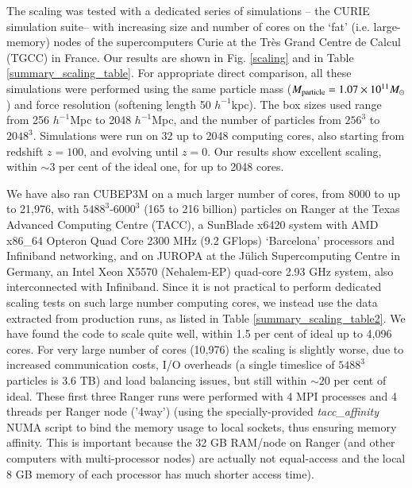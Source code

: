 

 
The scaling was tested with a dedicated series 
of simulations -- the CURIE simulation suite-- with increasing size and number of cores on the `fat' 
(i.e. large-memory) nodes of the supercomputers Curie at the Tr\`{e}s Grand Centre de Calcul (TGCC) in France. 
Our results are shown in Fig. \ref{scaling} and in 
Table \ref{summary_scaling_table}. For appropriate direct comparison,
all these simulations were performed using the same particle mass 
($M_{\rm particle}=1.07\times10^{11}M_\odot$) and force resolution 
(softening length 50 $h^{-1}$kpc). The box sizes used range from 256 $h^{-1}$Mpc
to 2048 $h^{-1}$Mpc, and the number of particles from $256^3$ to $2048^3$.
Simulations were run on 32 up to 2048 computing cores, also starting from 
redshift $z=100$, and evolving until $z=0$. Our results show excellent scaling, within 
$\sim3$ per cent of the ideal one, for up to 2048 cores. 

We have also ran {\small CUBEP3M} on a much larger number of cores, 
from 8000 to up to 21,976, with $5488^3$-$6000^3$ (165 to 216 billion) 
particles on Ranger at the Texas Advanced Computing Centre (TACC), a SunBlade 
x6420 system with AMD x86\_64 Opteron Quad Core 2300 MHz (9.2 GFlops)
`Barcelona' processors and Infiniband networking,%
and on JUROPA at the J\"ulich Supercomputing Centre in Germany, an Intel Xeon X5570 
(Nehalem-EP) quad-core 2.93 GHz system, also interconnected with Infiniband.%
Since it is not practical to perform dedicated scaling tests on such large number 
computing cores, we instead use the data extracted from production runs, 
as listed in Table \ref{summary_scaling_table2}. We have found the 
code to scale quite well, within 1.5 per cent of ideal up to 4,096 cores. 
For very large number of cores (10,976) the scaling is slightly worse,
due to increased communication 
costs, I/O overheads (a single timeslice of $5488^3$ particles is 3.6 TB)
and load balancing issues, but still within $\sim20$ per cent of ideal. 
These first three Ranger runs were performed 
with 4 {\small MPI} processes and 4 threads per Ranger node ('4way') (using the 
specially-provided {\it tacc\_affinity} NUMA script to bind the memory 
usage to local sockets, thus ensuring memory affinity. This is important 
because the 32 GB RAM/node on Ranger (and other computers with 
multi-processor nodes) are actually not equal-access and the local 
8 GB memory of each processor has much shorter access time).

